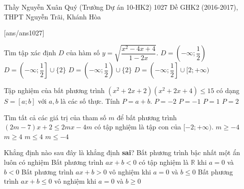 \begin{name}
{Thầy Nguyễn Xuân Quý (Trưởng Dự án 10-HK2)}
{1027 Đề GHK2 (2016-2017), THPT Nguyễn Trãi, Khánh Hòa}
\end{name}
\setcounter{ex}{0}\setcounter{bt}{0}
[ans/ans1027]
\begin{ex}%
Tìm tập xác định $D$ của hàm số $y=\sqrt{\dfrac{x^2-4x+4}{1-2x}}$.
\choice
{$D=\left(-\infty;\dfrac{1}{2}\right)$}
{$D=\left(-\infty;\dfrac{1}{2}\right]\cup\{2\}$}
{\True $D=\left(-\infty;\dfrac{1}{2}\right)\cup\{2\}$}
{$D=\left(-\infty;\dfrac{1}{2}\right]\cup [2;+\infty)$}
\end{ex}
\begin{ex}%
Tập nghiệm của bất phương trình $(x^2+2x+2)(x^2+2x+4)\le 15$ có dạng $S=[a;b]$ với $a, b$ là các số thực. Tính $P=a+b$.	
	\choice
	{\True $P=-2$}
	{$P=-1$}
	{$P=1$}
	{$P=2$}
\end{ex}
\begin{ex}%
Tìm tất cả các giá trị của tham số $m$ để bất phương trình $(2m-7)x+2\le 2mx-4m$ có tập nghiệm là tập con của $[-2;+\infty)$. 	
	\choice
	{\True $m\ge -4$}
	{$m\ge 4$}
	{$m\le 4$}
	{$m\le -4$}
\end{ex}
\begin{ex}%
Khẳng định nào sau đây là khẳng định \textbf{sai}?	
	\choice
	{Bất phương trình bậc nhất một ẩn luôn có nghiệm}
	{Bất phương trình $ax+b<0$ có tập nghiệm là $\mathbb{R}$ khi $a=0$ và $b<0$}
	{Bất phương trình $ax+b>0$ vô nghiệm khi $a=0$ và $b\le 0$}
	{\True Bất phương trình $ax+b\le 0$ vô nghiệm khi $a=0$ và $b\ge 0$}
\end{ex}
